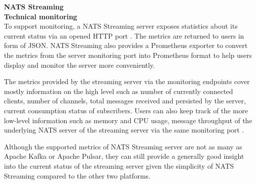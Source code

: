 \large \textbf{NATS Streaming}\\
\normalsize
\textbf{Technical monitoring}\\
To support monitoring, a NATS Streaming server exposes statistics about its current status via an opened HTTP port \cite{natsmonitoring}. The metrics are returned to users in form of JSON. NATS Streaming also provides a Prometheus exporter to convert the metrics from the server monitoring port into Prometheus format to help users display and monitor the server more conveniently. 

The metrics provided by the streaming server via the monitoring endpoints cover mostly information on the high level such as number of currently connected clients, number of channels, total messages received and persisted by the server, current consumption status of subscribers. Users can also keep track of the more low-level information such as memory and CPU usage, message throughput of the underlying NATS server of the streaming server via the same monitoring port \cite{normalnatsconfig}. 

Although the supported metrics of NATS Streaming server are not as many as Apache Kafka or Apache Pulsar, they can still provide a generally good insight into the current status of the streaming server given the simplicity of NATS Streaming compared to the other two platforms.

